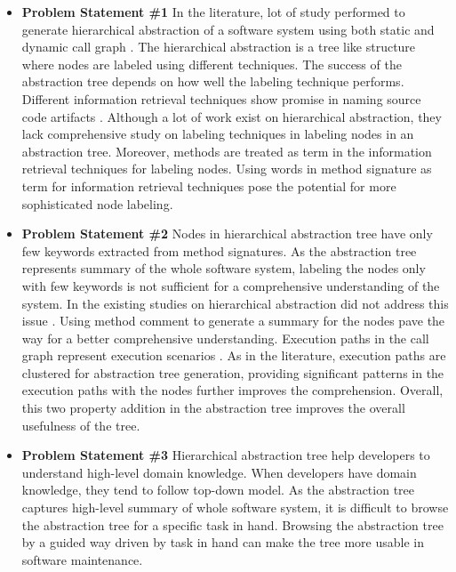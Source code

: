 \begin{itemize}
    \item \textbf{Problem Statement \#1} In the literature, lot of study performed to generate hierarchical abstraction of a software system using both static and dynamic call graph \cite{feng2018hierarchicalExecutionComprehension, gharibi2018automaticStaticCluster, xin2019identifyingFeaturesExecution}. The hierarchical abstraction is a tree like structure where nodes are labeled using different techniques. The success of the abstraction tree depends on how well the labeling technique performs. Different information retrieval techniques show promise in naming source code artifacts \cite{chen2016topicMiningRepositories, panichella2013topicModelsTasks, sun2016surveyTopicSE}. Although a lot of work exist on hierarchical abstraction, they lack comprehensive study on labeling techniques in labeling nodes in an abstraction tree. Moreover, methods are treated as term in the information retrieval techniques for labeling nodes. Using words in method signature as term for information retrieval techniques pose the potential for more sophisticated node labeling. 
    
    \item \textbf{Problem Statement \#2}
    Nodes in hierarchical abstraction tree have only few keywords extracted from method signatures. As the abstraction tree represents summary of the whole software system, labeling the nodes only with few keywords is not sufficient for a comprehensive understanding of the system. In the existing studies on hierarchical abstraction did not address this issue \cite{feng2018hierarchicalExecutionComprehension, gharibi2018automaticStaticCluster}. Using method comment to generate a summary for the nodes  pave the way for a better comprehensive understanding. Execution paths in the call graph represent execution scenarios \cite{salah2005scenariographer,pradel2009automatic}. As in the literature, execution paths are clustered for abstraction tree generation, providing significant patterns in the execution paths with the nodes further improves the comprehension. Overall, this two property addition in the abstraction tree improves the overall usefulness of the tree. 

    \item \textbf{Problem Statement \#3} Hierarchical abstraction tree help developers to understand high-level domain knowledge. When developers have domain knowledge, they tend to follow top-down model. As the abstraction tree captures high-level summary of whole software system, it is difficult to browse the abstraction tree for a specific task in hand. Browsing the abstraction tree by a guided way driven by task in hand can make the tree more usable in software maintenance. 
    
    
\end{itemize}



